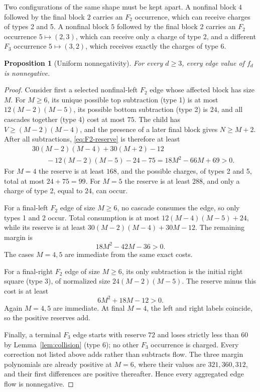 \documentclass[11pt]{amsart}
\newtheorem{proposition}[theorem]{Proposition}
\theoremstyle{definition}
\theoremstyle{remark}
\begin{document}
Two configurations of the same shape must be kept apart.  A nonfinal block
$4$ followed by the final block $2$ carries an $F_2$ occurrence, which can
receive charges of types 2 and 5.  A nonfinal block $5$ followed by the final
block $2$ carries an $F_2$ occurrence $5\mapsto(2,3)$, which can receive only
a charge of type 2, and a different $F_3$ occurrence $5\mapsto(3,2)$, which
receives exactly the charges of type 6.

\begin{proposition}[Uniform nonnegativity]
\label{prop:nonnegative}
For every $d\ge3$, every edge value of $f_d$ is nonnegative.
\end{proposition}

\begin{proof}
Consider first a selected nonfinal-left $F_2$ edge whose affected block
has size $M$.  For $M\ge6$, its unique possible top subtraction (type 1)
is at most $12(M-2)(M-5)$, its possible bottom subtraction (type 2) is
$24$, and all cascades together (type 4) cost at most $75$.  The child has
$V\ge(M-2)(M-4)$, and the presence of a later final block gives
$N\ge M+2$.  After all subtractions, \eqref{eq:F2-reserve} is therefore
at least
\begin{align*}
 &30(M-2)(M-4)+30(M+2)-12\\
 &\qquad{}-12(M-2)(M-5)-24-75
 =18M^2-66M+69>0.
\end{align*}
For $M=4$ the reserve is at least $168$, and the possible charges, of
types 2 and 5, total at most $24+75=99$.  For $M=5$ the reserve is at least
$288$, and only a charge of type 2, equal to $24$, can occur.

For a final-left $F_2$ edge of size $M\ge6$, no cascade consumes the
edge, so only types 1 and 2 occur.  Total consumption is at most
$12(M-4)(M-5)+24$, while its reserve is at least
$30(M-2)(M-4)+30M-12$.  The remaining margin is
\[
 18M^2-42M-36>0.
\]
The cases $M=4,5$ are immediate from the same exact costs.

For a final-right $F_2$ edge of size $M\ge6$, its only subtraction is
the initial right square (type 3), of normalized size $24(M-2)(M-5)$.  The reserve
minus this cost is at least
\[
 6M^2+18M-12>0.
\]
Again $M=4,5$ are immediate.  At final $M=4$, the left and right labels
coincide, so the positive reserves add.

Finally, a terminal $F_3$ edge starts with reserve $72$ and loses
strictly less than $60$ by Lemma~\ref{lem:collision} (type 6); no other
$F_3$ occurrence is charged.  Every correction
not listed above adds rather than subtracts flow.  The three margin
polynomials are already positive at $M=6$, where their values are
$321,360,312$, and their first differences are positive thereafter.
Hence every aggregated edge flow is nonnegative.
\end{proof}
\end{document}
